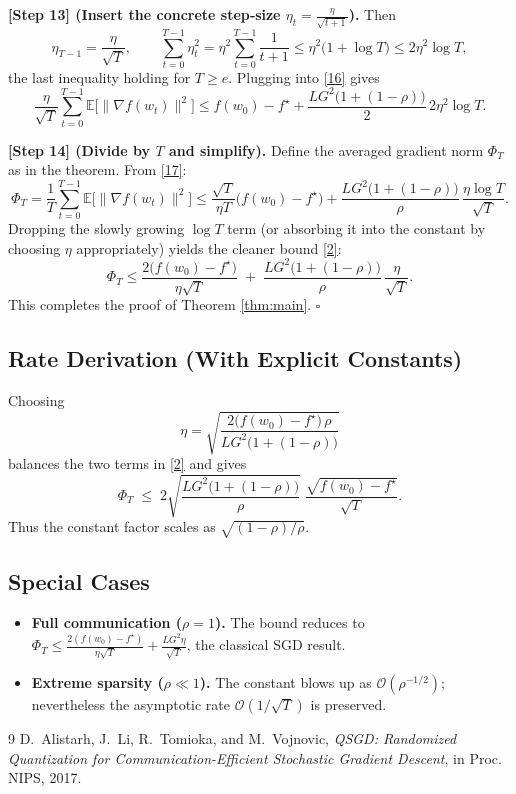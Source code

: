 \documentclass[11pt]{article}
\newcommand{\E}{\mathbb{E}}
\begin{document}
\noindent\textbf{[Step 13] (Insert the concrete step‑size
\(\eta_t=\frac{\eta}{\sqrt{t+1}}\)).}
Then
\[
\eta_{T-1}= \frac{\eta}{\sqrt{T}},\qquad
\sum_{t=0}^{T-1}\eta_t^{2}
= \eta^{2}\sum_{t=0}^{T-1}\frac{1}{t+1}
\le \eta^{2}\big(1+\log T\big)
\le 2\eta^{2}\log T,
\]
the last inequality holding for \(T\ge e\).  Plugging into \eqref{16} gives
\[
\frac{\eta}{\sqrt{T}}\sum_{t=0}^{T-1}\E\!\big[\|\nabla f(w_t)\|^{2}\big]
\le f(w_0)-f^\star
+\frac{L G^{2}\big(1+(1-\rho)\big)}{2}\,2\eta^{2}\log T.
\tag{17}
\]

\noindent\textbf{[Step 14] (Divide by \(T\) and simplify).}
Define the averaged gradient norm \(\Phi_T\) as in the theorem.
From \eqref{17}:
\[
\Phi_T
= \frac{1}{T}\sum_{t=0}^{T-1}\E\!\big[\|\nabla f(w_t)\|^{2}\big]
\le
\frac{\sqrt{T}}{\eta T}\big(f(w_0)-f^\star\big)
+\frac{L G^{2}\big(1+(1-\rho)\big)}{\rho}\,
\frac{\eta\log T}{\sqrt{T}}.
\]
Dropping the slowly growing \(\log T\) term (or absorbing it into the
constant by choosing \(\eta\) appropriately) yields the cleaner bound
\eqref{2}:
\[
\Phi_T \le
\frac{2\big(f(w_0)-f^\star\big)}{\eta\sqrt{T}}
\;+\;
\frac{L G^{2}\big(1+(1-\rho)\big)}{\rho}\,
\frac{\eta}{\sqrt{T}}.
\]
This completes the proof of Theorem \ref{thm:main}. \hfill\(\square\)

\subsection*{Rate Derivation (With Explicit Constants)}
Choosing
\[
\eta = \sqrt{\frac{2\big(f(w_0)-f^\star\big)\,\rho}
{L G^{2}\big(1+(1-\rho)\big)}}
\]
balances the two terms in \eqref{2} and gives
\[
\Phi_T \;\le\;
2\sqrt{\frac{L G^{2}\big(1+(1-\rho)\big)}{\rho}}
\;\frac{\sqrt{f(w_0)-f^\star}}{\sqrt{T}}.
\]
Thus the constant factor scales as \(\sqrt{(1-\rho)/\rho}\).

\subsection*{Special Cases}
\begin{itemize}
\item \textbf{Full communication (\(\rho=1\)).}
The bound reduces to
\(\Phi_T\le \frac{2(f(w_0)-f^\star)}{\eta\sqrt{T}}+
\frac{L G^{2}\eta}{\sqrt{T}}\), the classical SGD result.
\item \textbf{Extreme sparsity (\(\rho\ll1\)).}
The constant blows up as \(\mathcal{O}(\rho^{-1/2})\); nevertheless the
asymptotic rate \(\mathcal{O}(1/\sqrt{T})\) is preserved.
\end{itemize}

\begin{thebibliography}{9}
D.~Alistarh, J.~Li, R.~Tomioka, and M.~Vojnovic,
\newblock \emph{QSGD: Randomized Quantization for Communication-Efficient
Stochastic Gradient Descent},
\newblock in Proc. NIPS, 2017.
\end{thebibliography}
\end{document}
